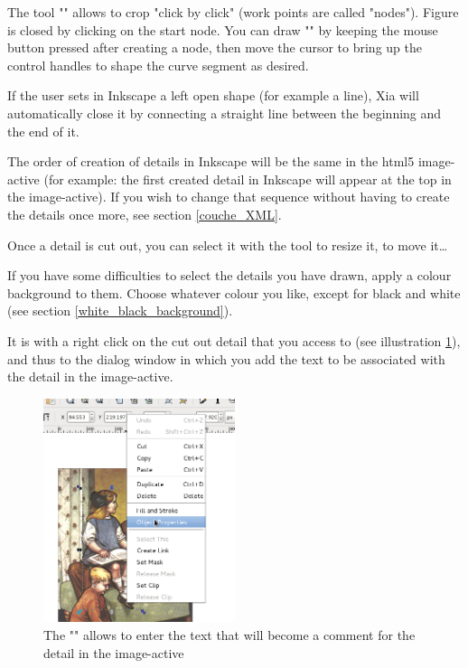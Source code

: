 The tool "" 
allows to crop "click by click" (work points are called 
"nodes").  Figure is closed by clicking on the start node. 
You can draw "" by keeping the mouse button pressed 
after creating a node, then move the cursor to bring up the control handles 
to shape the curve segment as desired.


\begin{alerte}
  If the user sets in Inkscape a left open shape (for example a line), Xia will automatically close it  by connecting a straight line between the beginning and the end of it.
\end{alerte}


\begin{alerte}
 The order of creation of details in Inkscape will be 
 the same in the html5 image-active (for example: the first created detail in
Inkscape will appear at the top in the image-active).
If you wish to change that sequence without having to create the details once more, see 
section \ref{couche_XML}.
\end{alerte}

Once a detail is cut out, you can select it with the tool  
 to resize it, to move it\ldots

\begin{astuce}
If you have some difficulties to select the details you have drawn,
apply a colour background to them. Choose whatever colour you like, except for black and white (see section \ref{white_black_background}).
\end{astuce}


It is with a right click on the cut out detail that you access to 
 (see illustration 
\ref{objet_properties}), and 
thus to the dialog window in which you add the text to be associated with the 
detail in the image-active.

\begin{figure}[htp]
 \centering
 \includegraphics[width=0.5\textwidth]{./images/proprietes_objet}
 \caption{The "" allows to enter the text that will become a 
 comment for the detail in the image-active}
 \label{objet_properties}
\end{figure}


